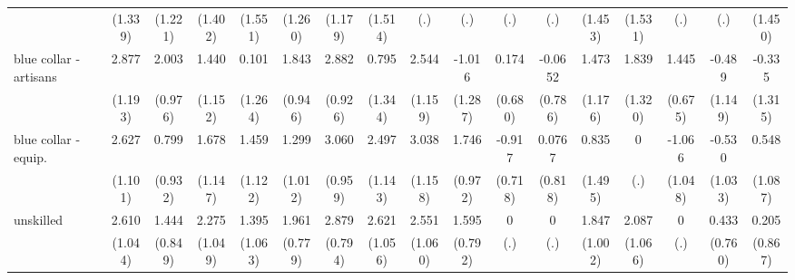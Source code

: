 {\begin{tabular}{l*{16}{c}}
                    &     (1.339)         &     (1.221)         &     (1.402)         &     (1.551)         &     (1.260)         &     (1.179)         &     (1.514)         &         (.)         &         (.)         &         (.)         &         (.)         &     (1.453)         &     (1.531)         &         (.)         &         (.)         &     (1.450)         \\
[1em]
blue collar - artisans&       2.877\sym{*}  &       2.003\sym{*}  &       1.440         &       0.101         &       1.843         &       2.882\sym{**} &       0.795         &       2.544\sym{*}  &      -1.016         &       0.174         &     -0.0652         &       1.473         &       1.839         &       1.445\sym{*}  &      -0.489         &      -0.335         \\
                    &     (1.193)         &     (0.976)         &     (1.152)         &     (1.264)         &     (0.946)         &     (0.926)         &     (1.344)         &     (1.159)         &     (1.287)         &     (0.680)         &     (0.786)         &     (1.176)         &     (1.320)         &     (0.675)         &     (1.149)         &     (1.315)         \\
[1em]
blue collar - equip.&       2.627\sym{*}  &       0.799         &       1.678         &       1.459         &       1.299         &       3.060\sym{**} &       2.497\sym{*}  &       3.038\sym{**} &       1.746         &      -0.917         &      0.0767         &       0.835         &           0         &      -1.066         &      -0.530         &       0.548         \\
                    &     (1.101)         &     (0.932)         &     (1.147)         &     (1.122)         &     (1.012)         &     (0.959)         &     (1.143)         &     (1.158)         &     (0.972)         &     (0.718)         &     (0.818)         &     (1.495)         &         (.)         &     (1.048)         &     (1.033)         &     (1.087)         \\
[1em]
unskilled           &       2.610\sym{*}  &       1.444         &       2.275\sym{*}  &       1.395         &       1.961\sym{*}  &       2.879\sym{***}&       2.621\sym{*}  &       2.551\sym{*}  &       1.595\sym{*}  &           0         &           0         &       1.847         &       2.087         &           0         &       0.433         &       0.205         \\
                    &     (1.044)         &     (0.849)         &     (1.049)         &     (1.063)         &     (0.779)         &     (0.794)         &     (1.056)         &     (1.060)         &     (0.792)         &         (.)         &         (.)         &     (1.002)         &     (1.066)         &         (.)         &     (0.760)         &     (0.867)         \\

\end{tabular}}
